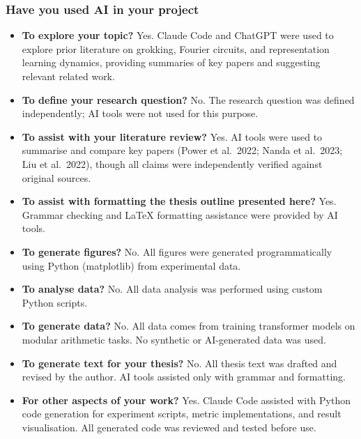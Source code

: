 \documentclass[12pt,openany,a4paper]{book}
\begin{document}
\subsubsection*{Have you used AI in your project}
\begin{itemize}
  \item \textbf{To explore your topic?} Yes. Claude Code and ChatGPT were used to explore prior literature on grokking, Fourier circuits, and representation learning dynamics, providing summaries of key papers and suggesting relevant related work.

  \item \textbf{To define your research question?} No. The research question was defined independently; AI tools were not used for this purpose.

  \item \textbf{To assist with your literature review?} Yes. AI tools were used to summarise and compare key papers (Power et al.\ 2022; Nanda et al.\ 2023; Liu et al.\ 2022), though all claims were independently verified against original sources.

  \item \textbf{To assist with formatting the thesis outline presented here?} Yes. Grammar checking and LaTeX formatting assistance were provided by AI tools.

  \item \textbf{To generate figures?} No. All figures were generated programmatically using Python (matplotlib) from experimental data.

  \item \textbf{To analyse data?} No. All data analysis was performed using custom Python scripts.

  \item \textbf{To generate data?} No. All data comes from training transformer models on modular arithmetic tasks. No synthetic or AI-generated data was used.

  \item \textbf{To generate text for your thesis?} No. All thesis text was drafted and revised by the author. AI tools assisted only with grammar and formatting.

  \item \textbf{For other aspects of your work?} Yes. Claude Code assisted with Python code generation for experiment scripts, metric implementations, and result visualisation. All generated code was reviewed and tested before use.
\end{itemize}
\end{document}
